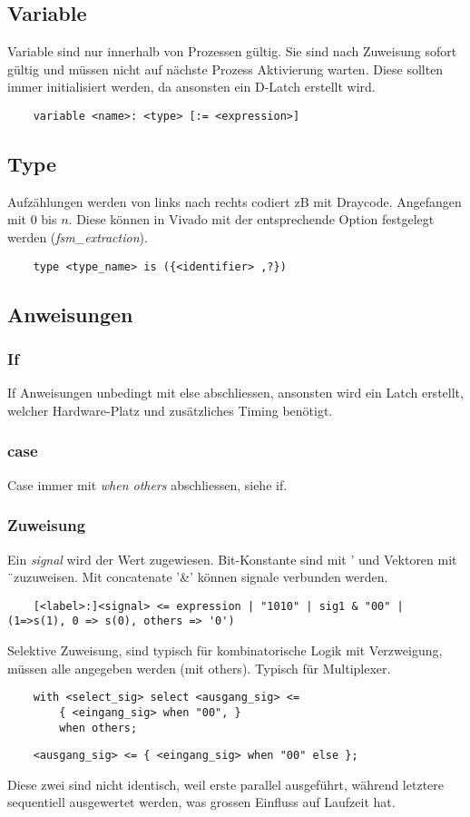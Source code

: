\subsection{Variable}
Variable sind nur innerhalb von Prozessen gültig. Sie sind nach Zuweisung sofort gültig und müssen nicht auf nächste Prozess Aktivierung warten. Diese sollten immer initialisiert werden, da ansonsten ein D-Latch erstellt wird.
\begin{lstlisting}
	variable <name>: <type> [:= <expression>]
\end{lstlisting}

\subsection{Type}
Aufzählungen werden von links nach rechts codiert zB mit Draycode. Angefangen mit $0$ bis $n$. Diese können in Vivado mit der entsprechende Option festgelegt werden (\textit{fsm\_extraction}).
\begin{lstlisting}
	type <type_name> is ({<identifier> ,?})
\end{lstlisting}

\subsection{Anweisungen}
\subsubsection{If}
If Anweisungen unbedingt mit else abschliessen, ansonsten wird ein Latch erstellt, welcher Hardware-Platz und zusätzliches Timing benötigt.

\subsubsection{case}
Case immer mit \textit{when others} abschliessen, siehe if.

\subsubsection{Zuweisung}
Ein \textit{signal} wird der Wert zugewiesen. Bit-Konstante sind mit ' und Vektoren mit \"\ zuzuweisen. Mit concatenate '\&' können signale verbunden werden. 
\begin{lstlisting}
	[<label>:]<signal> <= expression | "1010" | sig1 & "00" | (1=>s(1), 0 => s(0), others => '0') 
\end{lstlisting}
Selektive Zuweisung, sind typisch für kombinatorische Logik mit Verzweigung, müssen alle angegeben werden (mit others). Typisch für Multiplexer.
\begin{lstlisting}
	with <select_sig> select <ausgang_sig> <= 
		{ <eingang_sig> when "00", }
		when others;
\end{lstlisting}
\begin{lstlisting}
	<ausgang_sig> <= { <eingang_sig> when "00" else };
\end{lstlisting}
Diese zwei sind nicht identisch, weil erste parallel ausgeführt, während letztere sequentiell ausgewertet werden, was grossen Einfluss auf Laufzeit hat.
